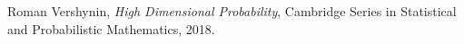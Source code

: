 \documentclass[12pt,reqno]{article}
\numberwithin{equation}{section}
\DeclareMathOperator{\DQ}{\mathcal{Q}}
\begin{document}
\begin{comment}
It is easy to see from our proof that for each $m$,
%
\[ \#(\DQ_m(X_m)) = \frac{1}{(M_1 \dots M_m)^d}. \]
%
Thus
%
\begin{align*}
    \log_{1/l_m}(\#(\DQ_m(X_m))) &= \frac{d \log(M_1 \dots M_m)}{\log(N_1 \dots N_m)}\\
    &\sim \frac{d \log(M_m)}{\log(N_m)}\\
    &= \frac{d \log(M_m)}{\log(M_m) + \log(K_m)}\\
    &= \frac{d}{1 + \log_{M_m}(K_m)}\\
    &\sim \frac{d}{1 + \left(\frac{s}{dn - s} + c\varepsilon \right)}\\
    &= \frac{d}{\frac{dn}{dn - s} + c\varepsilon_m}.
\end{align*}
%
Thus
%
\[ \lim_{m \to \infty} \log_{1/l_m}(\#(\DQ_m(X_m))) \leq \frac{dn - s}{n}. \]
%
In particular, this means $X$ has lower Minkowski dimension at most $(dn - s)/n$, which, together with the Fourier dimension bound, implies that $X$ is Salem.
\end{comment}

\begin{comment}
\section{K\"{o}rner's Work}

The last sections gives a first, positive result finding Salem sets avoiding rough configurations. However, as we showed in our last paper, given the same assumptions, one can find a set $X$ with \emph{Hausdorff dimension} $(dn - s)/(n-1)$ avoiding configurations. Improving the dimension to obtain this result requires a deeper knowledge of the stochastic behaviour of the set $\DQ_{m+1}(B) \cap \DQ_{m+1}(S^n)$, when $N_{m+1}$ is chosen significantly smaller relative to $M_{m+1}$. In the next section, we provide a summary of an argument due to K\"{o}rner, which deals with a very similar situation.
\end{comment}

\begin{thebibliography}{9}

    Roman Vershynin,
    \textit{High Dimensional Probability},
    Cambridge Series in Statistical and Probabilistic Mathematics,
    2018.

\end{thebibliography}
\end{document}
